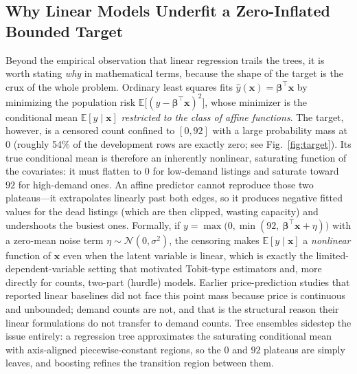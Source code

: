\documentclass[journal]{IEEEtran}
\begin{document}
\subsection{Why Linear Models Underfit a Zero-Inflated Bounded Target}
\label{sec:linearcritique}
Beyond the empirical observation that linear regression trails the trees, it is
worth stating \emph{why} in mathematical terms, because the shape of the target
is the crux of the whole problem. Ordinary least squares fits
$\hat y(\mathbf{x}) = \boldsymbol{\beta}^{\top}\mathbf{x}$ by minimizing the
population risk $\mathbb{E}\big[(y-\boldsymbol{\beta}^{\top}\mathbf{x})^{2}\big]$,
whose minimizer is the conditional mean $\mathbb{E}[y\mid\mathbf{x}]$
\emph{restricted to the class of affine functions}. The target, however, is a
censored count confined to $[0,92]$ with a large probability mass at $0$
(roughly 54\% of the development rows are exactly zero; see
Fig.~\ref{fig:target}). Its true conditional mean is therefore an inherently
nonlinear, saturating function of the covariates: it must flatten to $0$ for
low-demand listings and saturate toward $92$ for high-demand ones. An affine
predictor cannot reproduce those two plateaus---it extrapolates linearly past
both edges, so it produces negative fitted values for the dead listings (which
are then clipped, wasting capacity) and undershoots the busiest ones. Formally,
if $y=\max\!\big(0,\min(92,\ \boldsymbol{\beta}^{\top}\mathbf{x}+\eta)\big)$ with
a zero-mean noise term $\eta\sim\mathcal{N}(0,\sigma^{2})$,
the censoring makes $\mathbb{E}[y\mid\mathbf{x}]$ a \emph{nonlinear} function of
$\mathbf{x}$ even when the latent variable is linear, which is exactly the
limited-dependent-variable setting that motivated Tobit-type estimators
\cite{tobin1958} and, more directly for counts, two-part (hurdle) models.
Earlier price-prediction studies that reported linear baselines
\cite{gunter2018,wang2017} did not face this point mass because price is
continuous and unbounded; demand counts are not, and that is the structural
reason their linear formulations do not transfer to demand counts. Tree ensembles
sidestep the issue entirely: a regression tree approximates the saturating
conditional mean with axis-aligned piecewise-constant regions, so the $0$ and
$92$ plateaus are simply leaves, and boosting refines the transition region
between them.
\end{document}
